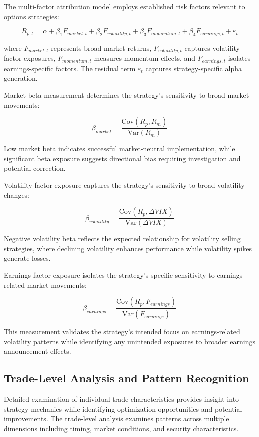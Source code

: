 \documentclass[
  american,
  11pt,
  11pt,
  letterpaper,
  onecolumn]{article}
\begin{document}
The multi-factor attribution model employs established risk factors
relevant to options strategies:

\[R_{p,t} = \alpha + \beta_1 F_{market,t} + \beta_2 F_{volatility,t} + \beta_3 F_{momentum,t} + \beta_4 F_{earnings,t} + \varepsilon_t\]

where \(F_{market,t}\) represents broad market returns,
\(F_{volatility,t}\) captures volatility factor exposures,
\(F_{momentum,t}\) measures momentum effects, and \(F_{earnings,t}\)
isolates earnings-specific factors. The residual term \(\varepsilon_t\)
captures strategy-specific alpha generation.

Market beta measurement determines the strategy's sensitivity to broad
market movements:

\[\beta_{market} = \frac{\text{Cov}(R_p, R_m)}{\text{Var}(R_m)}\]

Low market beta indicates successful market-neutral implementation,
while significant beta exposure suggests directional bias requiring
investigation and potential correction.

Volatility factor exposure captures the strategy's sensitivity to broad
volatility changes:

\[\beta_{volatility} = \frac{\text{Cov}(R_p, \Delta VIX)}{\text{Var}(\Delta VIX)}\]

Negative volatility beta reflects the expected relationship for
volatility selling strategies, where declining volatility enhances
performance while volatility spikes generate losses.

Earnings factor exposure isolates the strategy's specific sensitivity to
earnings-related market movements:

\[\beta_{earnings} = \frac{\text{Cov}(R_p, F_{earnings})}{\text{Var}(F_{earnings})}\]

This measurement validates the strategy's intended focus on
earnings-related volatility patterns while identifying any unintended
exposures to broader earnings announcement effects.

\subsection{Trade-Level Analysis and Pattern
Recognition}\label{trade-level-analysis-and-pattern-recognition}

Detailed examination of individual trade characteristics provides
insight into strategy mechanics while identifying optimization
opportunities and potential improvements. The trade-level analysis
examines patterns across multiple dimensions including timing, market
conditions, and security characteristics.
\end{document}
